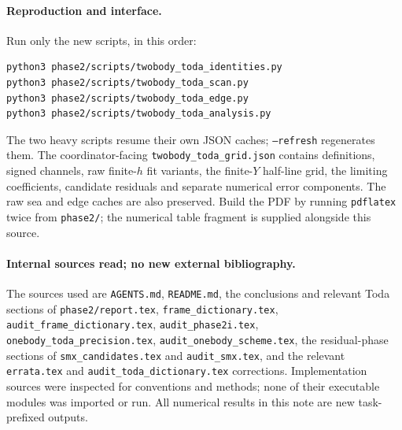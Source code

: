 \documentclass[11pt,a4paper]{article}
\newcommand{\file}[1]{\nolinkurl{#1}}
\begin{document}
\paragraph{Reproduction and interface.}
Run only the new scripts, in this order:
\begin{verbatim}
python3 phase2/scripts/twobody_toda_identities.py
python3 phase2/scripts/twobody_toda_scan.py
python3 phase2/scripts/twobody_toda_edge.py
python3 phase2/scripts/twobody_toda_analysis.py
\end{verbatim}
The two heavy scripts resume their own JSON caches; \texttt{--refresh}
regenerates them. The coordinator-facing \file{twobody_toda_grid.json}
contains definitions, signed channels, raw finite-$h$ fit variants, the
finite-$Y$ half-line grid, the limiting coefficients, candidate residuals
and separate numerical error components. The raw sea and edge caches are
also preserved. Build the PDF by running \texttt{pdflatex} twice from
\file{phase2/}; the numerical table fragment is supplied alongside this source.

\paragraph{Internal sources read; no new external bibliography.}
\begingroup\raggedright
The sources used are \file{AGENTS.md}, \file{README.md}, the conclusions
and relevant Toda sections of \file{phase2/report.tex},
\file{frame_dictionary.tex}, \file{audit_frame_dictionary.tex},
\file{audit_phase2i.tex}, \file{onebody_toda_precision.tex},
\file{audit_onebody_scheme.tex}, the residual-phase sections of
\file{smx_candidates.tex} and \file{audit_smx.tex}, and the relevant
\file{errata.tex} and \file{audit_toda_dictionary.tex} corrections.
Implementation sources were inspected for conventions and methods;
none of their executable modules was imported or run.
All numerical results in this note are new task-prefixed outputs.
\par\endgroup
\end{document}
